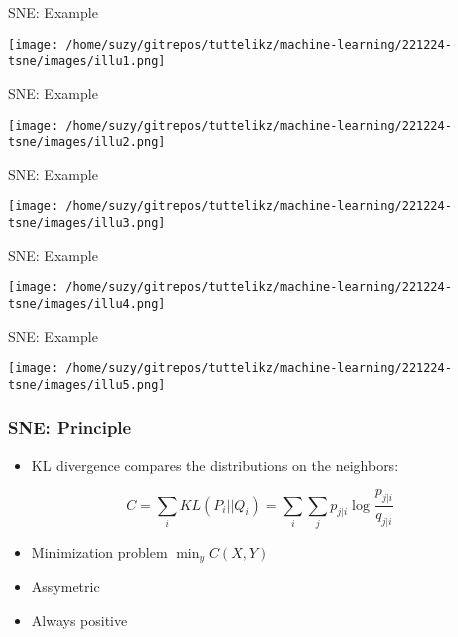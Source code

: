 \documentclass{beamer}
\begin{document}
    \begin{frame}{SNE: Example}
        \begin{center}
            \texttt{[image: /home/suzy/gitrepos/tuttelikz/machine-learning/221224-tsne/images/illu1.png]}
        \end{center}
    \end{frame}
    \begin{frame}{SNE: Example}
        \begin{center}
            \texttt{[image: /home/suzy/gitrepos/tuttelikz/machine-learning/221224-tsne/images/illu2.png]}
        \end{center}
    \end{frame}
    \begin{frame}{SNE: Example}
        \begin{center}
            \texttt{[image: /home/suzy/gitrepos/tuttelikz/machine-learning/221224-tsne/images/illu3.png]}
        \end{center}
    \end{frame}
    \begin{frame}{SNE: Example}
        \begin{center}
            \texttt{[image: /home/suzy/gitrepos/tuttelikz/machine-learning/221224-tsne/images/illu4.png]}
        \end{center}
    \end{frame}
    \begin{frame}{SNE: Example}
        \begin{center}
            \texttt{[image: /home/suzy/gitrepos/tuttelikz/machine-learning/221224-tsne/images/illu5.png]}
        \end{center}
    \end{frame}

    \begin{frame}
        \frametitle{SNE: Principle}
        \begin{itemize}
            \item KL divergence compares the distributions on the neighbors:
        \end{itemize}
        
        \begin{center}
            $$C=\sum_{i}^{} KL(P_i||Q_i) = \sum_{i}^{}\sum_{j}^{} p_{j|i}\log{\frac{p_{j|i}}{q_{j|i}}}$$
        \end{center}
        \bigskip
        \begin{itemize}
            \item Minimization problem $\min_{y}{C(X,Y)}$
            \item Assymetric
            \item Always positive
        \end{itemize}
    \end{frame}
\end{document}
